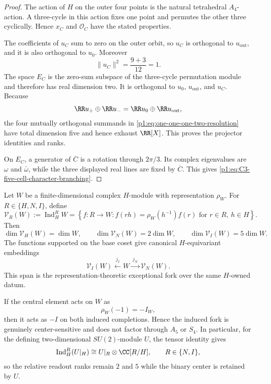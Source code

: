 \documentclass[11pt]{article}
\begin{document}
\begin{proof}
The action of \(H\) on the outer four points is the natural tetrahedral
\(A_4\)-action.  A three-cycle in this action fixes one point and permutes the
other three cyclically.  Hence \(x_C\) and \(\mathcal O_C\) have the stated
properties.

The coefficients of \(u_C\) sum to zero on the outer orbit, so \(u_C\) is
orthogonal to \(u_{\mathrm{out}}\), and it is also orthogonal to \(u_0\).
Moreover
\[
    \|u_C\|^2=\frac{9+3}{12}=1.
\]
The space \(E_C\) is the zero-sum subspace of the three-cycle permutation
module and therefore has real dimension two.  It is orthogonal to
\(u_0\), \(u_{\mathrm{out}}\), and \(u_C\).  Because
\[
    \RR u_+\oplus\RR u_-
    =\RR u_0\oplus\RR u_{\mathrm{out}},
\]
the four mutually orthogonal summands in
\eqref{p1:eq:one-one-one-two-resolution} have total dimension five and hence
exhaust \(\RR[X]\).  This proves the projector identities and ranks.

On \(E_C\), a generator of \(\overline C\) is a rotation through \(2\pi/3\).
Its complex eigenvalues are \(\omega\) and \(\bar\omega\), while the three
displayed real lines are fixed by \(\overline C\).  This gives
\eqref{p1:eq:C3-five-cell-character-branching}.
\end{proof}

\begin{proposition}
\label{p1:prop:center-sensitive-induced-exceptional-fork}
Let \(W\) be a finite-dimensional complex \(H\)-module with representation
\(\rho_W\).  For \(R\in\{H,N,I\}\), define
\[
    \mathcal V_R(W):=\operatorname{Ind}_H^R W
    =\left\{f:R\to W:
      f(rh)=\rho_W(h^{-1})f(r)
      \text{ for }r\in R,\ h\in H
      \right\}.
\]
Then
\begin{equation}
\label{p1:eq:induced-completion-ranks}
    \dim\mathcal V_H(W)=\dim W,
    \qquad
    \dim\mathcal V_N(W)=2\dim W,
    \qquad
    \dim\mathcal V_I(W)=5\dim W.
\end{equation}
The functions supported on the base coset give canonical \(H\)-equivariant
embeddings
\begin{equation}
\label{p1:eq:induced-completion-span}
    \mathcal V_I(W)
    \xleftarrow{\ j_I\ }
    W
    \xrightarrow{\ j_N\ }
    \mathcal V_N(W).
\end{equation}
This span is the representation-theoretic exceptional fork over the same
\(H\)-owned datum.

If the central element acts on \(W\) as
\[
    \rho_W(-1)=-I_W,
\]
then it acts as \(-I\) on both induced completions.  Hence the induced fork is
genuinely center-sensitive and does not factor through \(A_5\) or \(S_4\).
In particular, for the defining two-dimensional \(SU(2)\)-module \(U\), the
tensor identity gives
\begin{equation}
\label{p1:eq:defining-module-induced-fork}
    \operatorname{Ind}_H^R(U|_H)
    \cong U|_R\otimes\CC[R/H],
    \qquad R\in\{N,I\},
\end{equation}
so the relative readout ranks remain \(2\) and \(5\) while the binary center
is retained by \(U\).
\end{proposition}
\end{document}
